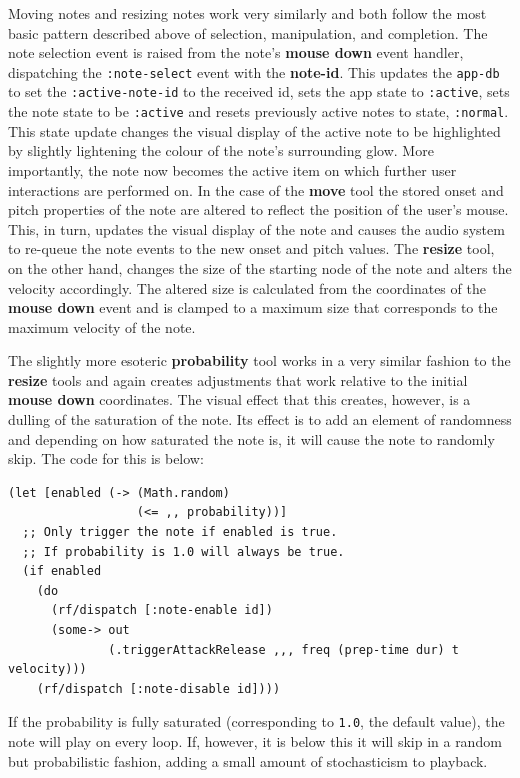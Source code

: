 \documentclass[12pt]{report}
\begin{document}
Moving notes and resizing notes work very similarly and both follow the most
basic pattern described above of selection, manipulation, and completion. The
note selection event is raised from the note's \textbf{mouse down} event handler,
dispatching the \texttt{:note-select} event with the \textbf{note-id}. This updates the
\texttt{app-db} to set the \texttt{:active-note-id} to the received id, sets the app state to
\texttt{:active}, sets the note state to be \texttt{:active} and resets previously active
notes to state, \texttt{:normal}. This state update changes the visual display of the
active note to be highlighted by slightly lightening the colour of the note's
surrounding glow. More importantly, the note now becomes the active item on
which further user interactions are performed on. In the case of the \textbf{move} tool
the stored onset and pitch properties of the note are altered to reflect the
position of the user's mouse. This, in turn, updates the visual display of the
note and causes the audio system to re-queue the note events to the new onset
and pitch values. The \textbf{resize} tool, on the other hand, changes the size of the
starting node of the note and alters the velocity accordingly. The altered size
is calculated from the coordinates of the \textbf{mouse down} event and is clamped to a
maximum size that corresponds to the maximum velocity of the note.

The slightly more esoteric \textbf{probability} tool works in a very similar fashion to
the \textbf{resize} tools and again creates adjustments that work relative to the
initial \textbf{mouse down} coordinates. The visual effect that this creates, however,
is a dulling of the saturation of the note. Its effect is to add an element of
randomness and depending on how saturated the note is, it will cause the note to
randomly skip. The code for this is below:
\begin{footnotesize}
\begin{verbatim}
(let [enabled (-> (Math.random)
                  (<= ,, probability))]
  ;; Only trigger the note if enabled is true.
  ;; If probability is 1.0 will always be true.
  (if enabled
    (do
      (rf/dispatch [:note-enable id])
      (some-> out
              (.triggerAttackRelease ,,, freq (prep-time dur) t velocity)))
    (rf/dispatch [:note-disable id])))
\end{verbatim}
\end{footnotesize}
If the probability is fully saturated (corresponding to \texttt{1.0}, the default
value), the note will play on every loop. If, however, it is below this it will
skip in a random but probabilistic fashion, adding a small amount of
stochasticism to playback.
\end{document}
